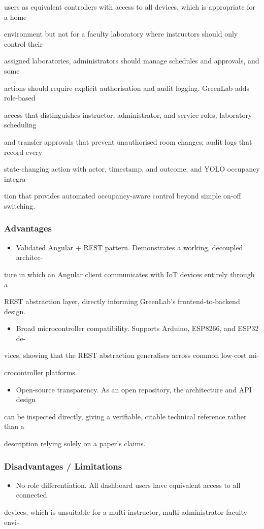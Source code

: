 users as equivalent controllers with access to all devices, which is appropriate for a home

environment but not for a faculty laboratory where instructors should only control their

assigned laboratories, administrators should manage schedules and approvals, and some

actions should require explicit authorisation and audit logging. GreenLab adds role-based

access that distinguishes instructor, administrator, and service roles; laboratory scheduling

and transfer approvals that prevent unauthorised room changes; audit logs that record every

state-changing action with actor, timestamp, and outcome; and YOLO occupancy integra-

tion that provides automated occupancy-aware control beyond simple on-off switching.


\subsubsection*{Advantages}
\begin{itemize}
	\item Validated Angular + REST pattern. Demonstrates a working, decoupled architec-
\end{itemize}
ture in which an Angular client communicates with IoT devices entirely through a

REST abstraction layer, directly informing GreenLab's frontend-to-backend design.

\begin{itemize}
	\item Broad microcontroller compatibility. Supports Arduino, ESP8266, and ESP32 de-
\end{itemize}
vices, showing that the REST abstraction generalises across common low-cost mi-

crocontroller platforms.

\begin{itemize}
	\item Open-source transparency. As an open repository, the architecture and API design
\end{itemize}
can be inspected directly, giving a veriﬁable, citable technical reference rather than a

description relying solely on a paper's claims.


\subsubsection*{Disadvantages / Limitations}
\begin{itemize}
	\item No role differentiation. All dashboard users have equivalent access to all connected
\end{itemize}
devices, which is unsuitable for a multi-instructor, multi-administrator faculty envi-

